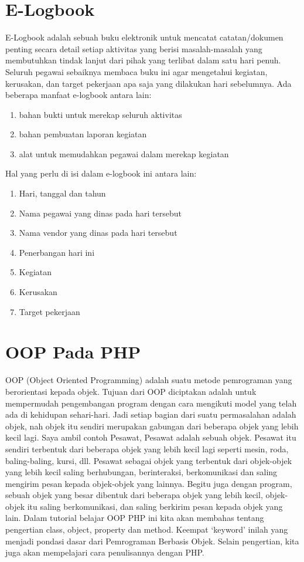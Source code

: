 \section{E-Logbook}
E-Logbook adalah sebuah buku elektronik untuk mencatat catatan/dokumen penting secara detail setiap aktivitas yang berisi masalah-masalah yang membutuhkan tindak lanjut dari pihak yang terlibat dalam satu hari penuh. Seluruh pegawai sebaiknya membaca buku ini agar mengetahui kegiatan, kerusakan, dan target pekerjaan apa saja yang dilakukan hari sebelumnya. Ada beberapa manfaat e-logbook antara lain:
\begin{enumerate}
\item bahan bukti untuk merekap seluruh aktivitas
\item bahan pembuatan laporan kegiatan
\item alat untuk memudahkan pegawai dalam merekap kegiatan
 \end{enumerate}

Hal yang perlu di isi dalam e-logbook ini antara lain:
\begin{enumerate}
\item Hari, tanggal dan tahun
\item Nama pegawai yang dinas pada hari tersebut
\item Nama vendor yang dinas pada hari tersebut
\item Penerbangan hari ini
\item Kegiatan
\item Kerusakan
\item Target pekerjaan
\end{enumerate}

\section{OOP Pada PHP}
OOP (Object Oriented Programming) adalah suatu metode pemrograman yang berorientasi kepada objek. Tujuan dari OOP diciptakan adalah untuk mempermudah pengembangan program dengan cara mengikuti model yang telah ada di kehidupan sehari-hari. Jadi setiap bagian dari suatu permasalahan adalah objek, nah objek itu sendiri merupakan gabungan dari beberapa objek yang lebih kecil lagi. Saya ambil contoh Pesawat, Pesawat adalah sebuah objek. Pesawat itu sendiri terbentuk dari beberapa objek yang lebih kecil lagi seperti mesin, roda, baling-baling, kursi, dll. Pesawat sebagai objek yang terbentuk dari objek-objek yang lebih kecil saling berhubungan, berinteraksi, berkomunikasi dan saling mengirim pesan kepada objek-objek yang lainnya. Begitu juga dengan program, sebuah objek yang besar dibentuk dari beberapa objek yang lebih kecil, objek-objek itu saling berkomunikasi, dan saling berkirim pesan kepada objek yang lain.
Dalam tutorial belajar OOP PHP ini kita akan membahas tentang pengertian class, object, property dan method. Keempat ‘keyword’ inilah yang menjadi pondasi dasar dari Pemrograman Berbasis Objek. Selain pengertian, kita juga akan mempelajari cara penulisannya dengan PHP.
